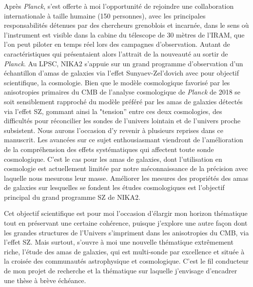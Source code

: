 \documentclass[a4paper, 12pt]{report}
\begin{document}
Après \emph{Planck}, s'est offerte à moi l'opportunité de rejoindre une
collaboration internationale à taille humaine (150 personnes), avec
les principales responsabilités détenues par des chercheurs grenoblois
et incarnée, dans le sens où l'instrument est visible dans la cabine
du télescope de 30 mètres de l'IRAM, que l'on peut piloter en temps
réel lors des campagnes d'observation. Autant de caractéristiques qui
présentaient alors l'attrait de la nouveauté au sortir de \emph{Planck}. Au
LPSC, NIKA2 s'appuie sur un grand programme d'observation d'un
échantillon d'amas de galaxies via l'effet Sunyaev-Zel'dovich avec pour
objectif scientifique, la cosmologie. Bien que le modèle cosmologique
favorisé par les anisotropies primaires du CMB de l'analyse cosmologique de \emph{Planck} de 2018 se
soit sensiblement rapproché du modèle préféré par les amas de galaxies
détectés via l'effet SZ, gommant ainsi la "tension'' entre ces deux
cosmologies, des difficultés pour réconcilier les sondes de l'univers
lointain et de l'univers proche subsistent. Nous aurons l'occasion d'y
revenir à plusieurs reprises dans ce manuscrit. Les avancées sur ce sujet
enthousiasmant viendront de l'amélioration de la compréhension des
effets systématiques qui affectent toute sonde cosmologique. C'est le
cas pour les amas de galaxies, dont l'utilisation en cosmologie est
actuellement limitée par notre méconnaissance de la précision avec
laquelle nous mesurons leur masse. Améliorer les mesures des
propriétés des amas de galaxies sur lesquelles se fondent les études
cosmologiques est l'objectif principal du grand programme SZ de NIKA2. 

Cet objectif scientifique est pour moi l'occasion d'élargir mon
horizon thématique tout en préservant une certaine cohérence, puisque
j'explore une autre façon dont les grandes structures de l'Univers
s'impriment dans les anisotropies du CMB, via l'effet SZ. Mais
surtout, s'ouvre à moi une nouvelle thématique extrêmement riche,
l'étude des amas de galaxies, qui est multi-sonde par excellence et
située à la croisée des communautés astrophysique et
cosmologique. C'est le fil conducteur de mon projet de recherche et la
thématique sur laquelle j'envisage d'encadrer une thèse à brève
échéance.
\end{document}
